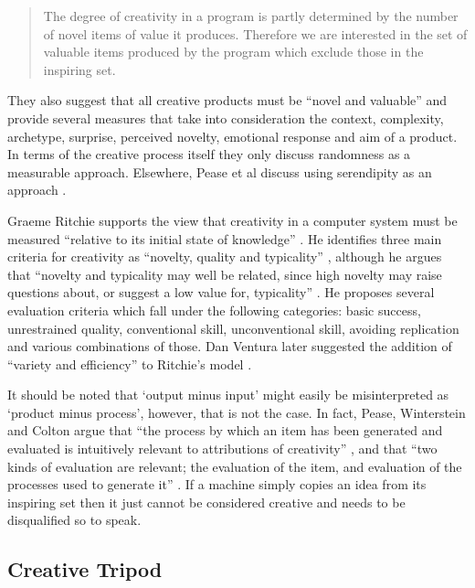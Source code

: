 \begin{quotation}
  The degree of creativity in a program is partly determined by the number of novel items of value it produces. Therefore we are interested in the set of valuable items produced by the program which exclude those in the inspiring set. 
\end{quotation}

They also suggest that all creative products must be ``novel and valuable'' \autocite[p.1]{Pease2001} and provide several measures that take into consideration the context, complexity, archetype, surprise, perceived novelty, emotional response and aim of a product. In terms of the creative process itself they only discuss randomness as a measurable approach. Elsewhere, Pease et al discuss using serendipity as an approach \citeyear{Pease2013}.

Graeme Ritchie supports the view that creativity in a computer system must be measured ``relative to its initial state of knowledge'' \citeyear[p.72]{Ritchie2007}. He identifies three main criteria for creativity as ``novelty, quality and typicality'' \citeyear[p.72-73]{Ritchie2007}, although he argues that ``novelty and typicality may well be related, since high novelty may raise questions about, or suggest a low value for, typicality'' \citeyear[p.73]{Ritchie2007} \citeyear[see also][]{Ritchie2001}. He proposes several evaluation criteria which fall under the following categories: \citeyear[p.91-92]{Ritchie2007} basic success, unrestrained quality, conventional skill, unconventional skill, avoiding replication and various combinations of those. Dan Ventura later suggested the addition of ``variety and efficiency'' to Ritchie's model \citeyear[p.7]{Ventura2008}.

It should be noted that `output minus input' might easily be misinterpreted as `product minus process', however, that is not the case. In fact, Pease, Winterstein and Colton argue that ``the process by which an item has been generated and evaluated is intuitively relevant to attributions of creativity'' \citeyear[p.6]{Pease2001}, and that ``two kinds of evaluation are relevant; the evaluation of the item, and evaluation of the processes used to generate it'' \citeyear[p.7]{Pease2001}. If a machine simply copies an idea from its inspiring set then it just cannot be considered creative and needs to be disqualified so to speak.


\subsection{Creative Tripod}

